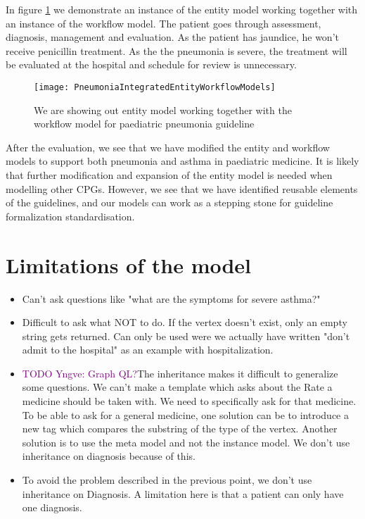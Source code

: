 \documentclass[a4paper,12pt]{book}
\begin{document}
In figure \ref{fig:PneumoniaPneumoniaIntegratedEntityWorkflowModels} we demonstrate an instance of the entity model working together with an instance of the workflow model. The patient goes through assessment, diagnosis, management and evaluation. As the patient has jaundice, he won't receive penicillin treatment. As the the pneumonia is severe, the treatment will be evaluated at the hospital and schedule for review is unnecessary. 
\begin{figure}[h!]
	\caption {We are showing out entity model working together with the workflow model for paediatric pneumonia guideline \parencite{RepublicofKeny2016}}
	\label{fig:PneumoniaPneumoniaIntegratedEntityWorkflowModels}
	\texttt{[image: PneumoniaIntegratedEntityWorkflowModels]}	
\end{figure}

After the evaluation, we see that we have modified the entity and workflow models to support both pneumonia and asthma in paediatric medicine. It is likely that further modification and expansion of the entity model is needed when modelling other CPGs. However, we see that we have identified reusable elements of the guidelines, and our models can work as a stepping stone for guideline formalization standardisation.
\section{Limitations of the model}
\begin{itemize}
	\item Can't ask questions like "what are the symptoms for severe asthma?"
	\item Difficult to ask what NOT to do. If the vertex doesn't exist, only an empty string gets returned. Can only be used were we actually have written "don't admit to the hospital" as an example with hospitalization.
	\item \textcolor{purple}{TODO Yngve: Graph QL?}The inheritance makes it difficult to generalize some questions. We can't make a template which asks about the Rate a medicine should be taken with. We need to specifically ask for that medicine. To be able to ask for a general medicine, one solution can be to introduce a new tag which compares the substring of the type of the vertex. Another solution is to use the meta model and not the instance model. We don't use inheritance on diagnosis because of this.
	\item To avoid the problem described in the previous point, we don't use inheritance on Diagnosis. A limitation here is that  
	a patient can only have one diagnosis.
\end{itemize}
\end{document}

